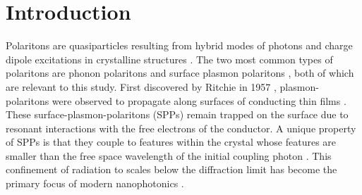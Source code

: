 \documentclass[12pt]{report}
\begin{document}
  \section{Introduction}
  \label{sec:intro}
  	Polaritons are quasiparticles resulting from hybrid modes of photons and charge dipole excitations in crystalline structures \cite{Tolpygo:50}. The two most common types of polaritons are phonon polaritons \cite{Tolpygo:50, Huang:51, Huber:08} and surface plasmon polaritons \cite{Barnes:03}, both of which are relevant to this study. First discovered by Ritchie in 1957 \cite{Ritchie:57}, plasmon-polaritons were observed to propagate along surfaces of conducting thin films \cite{Pines:52}. These surface-plasmon-polaritons (SPPs) remain trapped on the surface due to resonant interactions with the free electrons of the conductor. A unique property of SPPs is that they couple to features within the crystal whose features are smaller than the free space wavelength of the initial coupling photon \cite{Pendry:99}. This confinement of radiation to scales below the diffraction limit has become the primary focus of modern nanophotonics \cite{Caldwell:14}.
\end{document}
